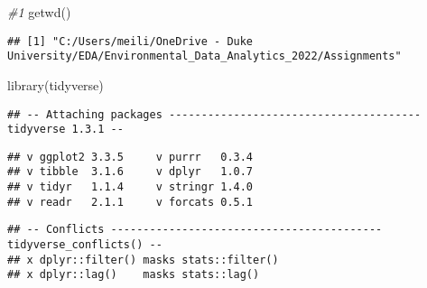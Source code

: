 \documentclass[
]{article}
\newenvironment{Shaded}{\begin{snugshade}}{\end{snugshade}}
\newcommand{\AttributeTok}[1]{\textcolor[rgb]{0.77,0.63,0.00}{#1}}
\newcommand{\CommentTok}[1]{\textcolor[rgb]{0.56,0.35,0.01}{\textit{#1}}}
\newcommand{\ConstantTok}[1]{\textcolor[rgb]{0.00,0.00,0.00}{#1}}
\newcommand{\DecValTok}[1]{\textcolor[rgb]{0.00,0.00,0.81}{#1}}
\newcommand{\FunctionTok}[1]{\textcolor[rgb]{0.00,0.00,0.00}{#1}}
\newcommand{\NormalTok}[1]{#1}
\newcommand{\OtherTok}[1]{\textcolor[rgb]{0.56,0.35,0.01}{#1}}
\newcommand{\SpecialCharTok}[1]{\textcolor[rgb]{0.00,0.00,0.00}{#1}}
\newcommand{\StringTok}[1]{\textcolor[rgb]{0.31,0.60,0.02}{#1}}
\begin{document}
\begin{Shaded}
\begin{Highlighting}[]
\CommentTok{\#1}
\FunctionTok{getwd}\NormalTok{()}
\end{Highlighting}
\end{Shaded}

\begin{verbatim}
## [1] "C:/Users/meili/OneDrive - Duke University/EDA/Environmental_Data_Analytics_2022/Assignments"
\end{verbatim}

\begin{Shaded}
\begin{Highlighting}[]
\FunctionTok{library}\NormalTok{(tidyverse)}
\end{Highlighting}
\end{Shaded}

\begin{verbatim}
## -- Attaching packages --------------------------------------- tidyverse 1.3.1 --
\end{verbatim}

\begin{verbatim}
## v ggplot2 3.3.5     v purrr   0.3.4
## v tibble  3.1.6     v dplyr   1.0.7
## v tidyr   1.1.4     v stringr 1.4.0
## v readr   2.1.1     v forcats 0.5.1
\end{verbatim}

\begin{verbatim}
## -- Conflicts ------------------------------------------ tidyverse_conflicts() --
## x dplyr::filter() masks stats::filter()
## x dplyr::lag()    masks stats::lag()
\end{verbatim}

\begin{Shaded}
\end{Shaded}
\end{document}
